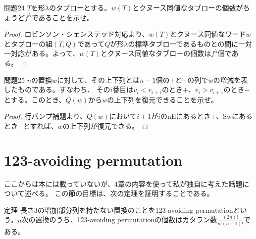 \documentclass[a4paper,11pt]{jsarticle}
\theoremstyle{plain}
\theoremstyle{definition}
\renewcommand{\(}{\left(}
\renewcommand{\)}{\right)}
\renewcommand{\[}{\left[}
\renewcommand{\]}{\right]}
\renewcommand{\{}{\left\lbrace}
\renewcommand{\}}{\right\rbrace}
\begin{document}
\begin{itembox}[l]{問題24}
    $T$を形$\lambda$のタブローとする。$w(T)$とクヌース同値なタブローの個数がちょうど$f^{\lambda}$であることを示せ。
\end{itembox}

\begin{proof}
    ロビンソン・シェンステッド対応より、$w(T)$とクヌース同値なワード$w$とタブローの組$(T,Q)$であって$Q$が形$\lambda$の標準タブローであるものとの間に一対一対応がある。よって、$w(T)$とクヌース同値なタブローの個数は$f^{\lambda}$個である。
\end{proof}

\begin{itembox}[l]{問題25}
    $n$の置換$w$に対して、その上下列とは$n-1$個の$+$と$-$の列で$w$の増減を表したものである。すなわち、
    その$i$番目は$v_i < v_{i+1}$のとき$+$、$v_i > v_{i+1}$のとき$-$とする。このとき、$Q(w)$から$w$の上下列を復元できることを示せ。
\end{itembox}

\begin{proof}
    行バンプ補題より、$Q(w)$において$i+1$が$i$のnEにあるとき$+$、Swにあるとき$-$とすれば、$w$の上下列が復元できる。
\end{proof}

\newpage
\section{123-avoiding permutation}

ここからは本には載っていないが、4章の内容を使って私が独自に考えた話題について述べる。
この節の目標は、次の定理を証明することである。

\begin{itembox}[l]{定理}
    長さ$3$の増加部分列を持たない置換のことを123-avoiding permutationという。$n$次の置換のうち、123-avoiding permutationの個数はカタラン数$\displaystyle \frac{(2n)!}{n!(n+1)!}$である。
\end{itembox}
\end{document}
